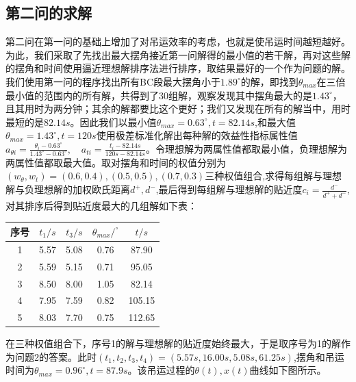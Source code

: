 \documentclass[withoutpreface,bwprint]{cumcmthesis} %
\begin{document}
\subsection{第二问的求解}
第二问在第一问的基础上增加了对吊运效率的考虑，也就是使吊运时间越短越好。为此，我们采取了先找出最大摆角接近第一问解得的最小值的若干解，再对这些解的摆角和时间使用逼近理想解排序法进行排序，取结果最好的一个作为问题的解。我们使用第一问的程序找出所有BC段最大摆角小于$1.89^{\circ}$的解，即找到$\theta_{max}$在三倍最小值的范围内的所有解，共得到了30组解，观察发现其中摆角最大的是$1.43^{\circ}$，且其用时为两分钟；其余的解都要比这个更好；我们又发现在所有的解当中，用时最短的是$82.14s$。因此我们以最小值$\theta_{max}=0.63^{\circ},t=82.14s$,和最大值$\theta_{max}=1.43^{\circ},t=120s$使用极差标准化解出每种解的效益性指标属性值$a_{\theta i}=\frac{\theta_i-0.63^{\circ}}{1.43^{\circ}-0.63^{\circ}},\quad a_{ti}=\frac{t_i-82.14s}{120s-82.14s}$。令理想解为两属性值都取最小值，负理想解为两属性值都取最大值。取对摆角和时间的权值分别为$(w_{\theta},w_t)=(0.6,0.4),(0.5,0.5),(0.7,0.3)$三种权值组合,求得每组解与理想解与负理想解的加权欧氏距离$d^+,d^-$,最后得到每组解与理想解的贴近度$c_i=\frac{d^-}{d^++d^-}$,对其排序后得到贴近度最大的几组解如下表：
\begin{table}[]
    \begin{tabular}{|c|c|c|c|c|}
    \hline
    序号 & $t_1/s$ & $t_3/s$ & $\theta_{max}/^{\circ}$ & $t/s$    \\ \hline
    1  & 5.57 & 5.08 & 0.76                    & 87.90  \\ \hline
    2  & 5.59 & 5.15 & 0.71                    & 95.05  \\ \hline
    3  & 8.50 & 8.00 & 1.05                    & 82.14  \\ \hline
    4  & 7.95 & 7.59 & 0.82                    & 105.15 \\ \hline
    5  & 8.03 & 7.70 & 0.75                    & 112.65 \\ \hline
    \end{tabular}
    \end{table}

在三种权值组合下，序号1的解与理想解的贴近度始终最大，于是取序号为1的解作为问题2的答案。此时$(t_1,t_2,t_3,t_4)=(5.57s,16.00s,5.08s,61.25s)$,摆角和吊运时间为$\theta_{max}=0.96^{\circ},t=87.9s$。该吊运过程的$\theta(t),x(t)$曲线如下图所示。
\end{document}
